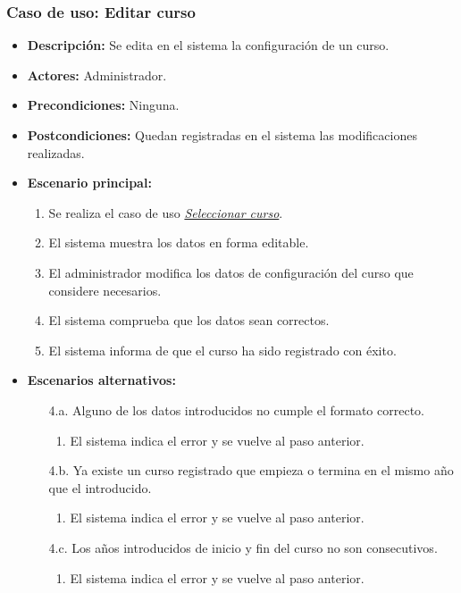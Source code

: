 \documentclass{book}
\begin{document}
\subsubsection*{Caso de uso: Editar curso}
\begin{itemize}
\item{\bf Descripción:} Se edita en el sistema la configuración de un curso.
\item{\bf Actores:} Administrador.
\item{\bf Precondiciones:} Ninguna.
\item{\bf Postcondiciones:} Quedan registradas en el sistema las modificaciones realizadas.
\item{\bf Escenario principal:}
  \begin{enumerate}
  \item Se realiza el caso de uso {\em \hyperref[select_curso]{Seleccionar curso}}.
  \item El sistema muestra los datos en forma editable.
  \item El administrador modifica los datos de configuración del curso que considere necesarios.
  \item El sistema comprueba que los datos sean correctos.
  \item El sistema informa de que el curso ha sido registrado con éxito.
  \end{enumerate}
\item{\bf Escenarios alternativos:}
  \begin{itemize}
  \item[4.a.] Alguno de los datos introducidos no cumple el formato correcto.
    \begin{enumerate}
    \item El sistema indica el error y se vuelve al paso anterior.
    \end{enumerate}
  \item[4.b.] Ya existe un curso registrado que empieza o termina en el mismo año que el introducido.
    \begin{enumerate}
    \item El sistema indica el error y se vuelve al paso anterior.
    \end{enumerate}
  \item[4.c.] Los años introducidos de inicio y fin del curso no son consecutivos.
    \begin{enumerate}
    \item El sistema indica el error y se vuelve al paso anterior.
    \end{enumerate}

\end{itemize}
\end{itemize}
\end{document}
